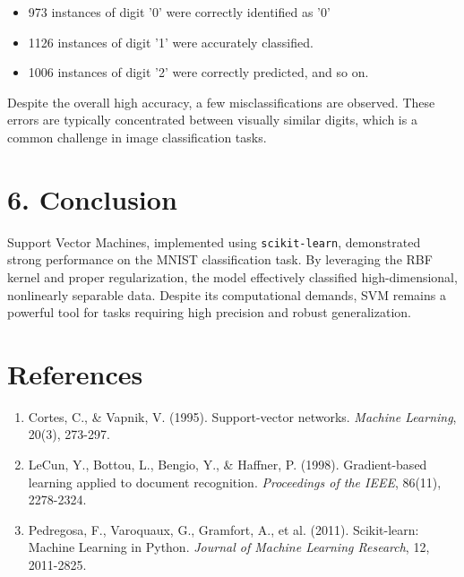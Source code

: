 \documentclass{article}
\begin{document}
\begin{itemize}
    \item 973 instances of digit '0' were correctly identified as '0'
    \item 1126 instances of digit '1' were accurately classified.
    \item 1006 instances of digit '2' were correctly predicted, and so on.
\end{itemize}

Despite the overall high accuracy, a few misclassifications are observed. These errors are typically concentrated between visually similar digits, which is a common challenge in image classification tasks. 

\section*{6. Conclusion}
Support Vector Machines, implemented using \texttt{scikit-learn}, demonstrated strong performance on the MNIST classification task. By leveraging the RBF kernel and proper regularization, the model effectively classified high-dimensional, nonlinearly separable data. Despite its computational demands, SVM remains a powerful tool for tasks requiring high precision and robust generalization.

\section*{References}
\begin{enumerate}
    \item Cortes, C., \& Vapnik, V. (1995). Support-vector networks. \textit{Machine Learning}, 20(3), 273-297.
    \item LeCun, Y., Bottou, L., Bengio, Y., \& Haffner, P. (1998). Gradient-based learning applied to document recognition. \textit{Proceedings of the IEEE}, 86(11), 2278-2324.
    \item Pedregosa, F., Varoquaux, G., Gramfort, A., et al. (2011). Scikit-learn: Machine Learning in Python. \textit{Journal of Machine Learning Research}, 12, 2011-2825.
\end{enumerate}
\end{document}
